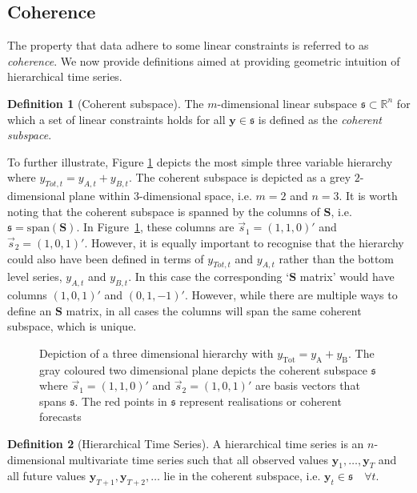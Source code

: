 \documentclass[12pt]{article}
\theoremstyle{definition}
\newtheorem{definition}{Definition}[section]
\theoremstyle{property}
\begin{document}
	\subsection{Coherence}\label{sec:cohpointf}
	
	The property that data adhere to some linear constraints is referred to as {\em coherence}.  We now provide definitions aimed at providing geometric intuition of hierarchical time series.
	
	 \begin{definition}[Coherent subspace]\label{def:cohspace}
	 	The $m$-dimensional linear subspace $\mathfrak{s}\subset \mathbb{R}^n$ for which a set of linear constraints holds for all $\bm{y}\in\mathfrak{s}$ is defined as the \emph{coherent subspace}.
	 \end{definition}
 
     To further illustrate, Figure \ref{fig:3D_hierarchy} depicts the most simple three variable hierarchy where $y_{Tot,t}=y_{A,t}+y_{B,t}$.  The coherent subspace is depicted as a grey $2$-dimensional plane within $3$-dimensional space, i.e. $m=2$ and $n=3$.  It is worth noting that the coherent subspace is spanned by the columns of $\bm{S}$, i.e.\ $\mathfrak{s}=\text{span}(\bm{S})$.  In Figure~\ref{fig:3D_hierarchy}, these columns are $\vec{s}_1=(1,1,0)'$ and $\vec{s}_2=(1,0,1)'$.  However, it is equally important to recognise that the hierarchy could also have been defined in terms of $y_{Tot,t}$ and $y_{A,t}$ rather than the bottom level series, $y_{A,t}$ and $y_{B,t}$. In this case the corresponding `$\bm{S}$ matrix' would have columns $(1,0,1)'$ and $(0,1,-1)'$.  However, while there are multiple ways to define an $\bm{S}$ matrix, in all cases the columns will span the same coherent subspace, which is unique.
     
     \begin{figure}[H]
     	\centering
     	\vspace{-0.9cm}
     	\small
     	\resizebox{\linewidth}{!}{
     		
     	}
     	\caption{Depiction of a three dimensional hierarchy with $y_{\text{Tot}} = y_{\text{A}} + y_{\text{B}}$. The gray coloured two dimensional plane depicts the coherent subspace $\mathfrak{s}$ where $\vec{s}_1 = (1,1,0)'$ and $\vec{s}_2 = (1, 0, 1)'$ are basis vectors that spans $\mathfrak{s}$. The red points in $\mathfrak{s}$ represent realisations or coherent forecasts}\label{fig:3D_hierarchy}
     \end{figure}
     
	 \begin{definition}[Hierarchical Time Series]\label{def:cohspace}
	 	A hierarchical time series is an $n$-dimensional multivariate time series such that all observed values $\bm{y}_1,\ldots,\bm{y}_T$ and all future values $\bm{y}_{T+1},\bm{y}_{T+2},\ldots$  lie in the coherent subspace, i.e. $\bm{y}_t\in\mathfrak{s}\quad\forall t$.
	 \end{definition}
	 
\end{document}

